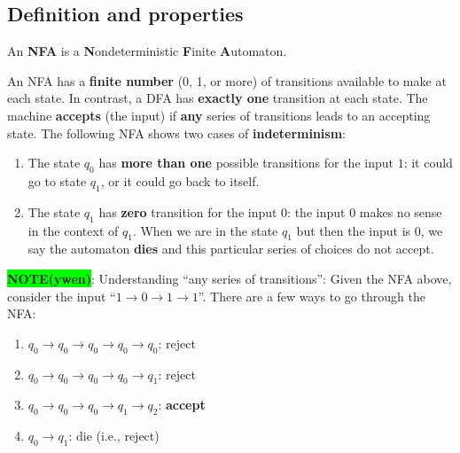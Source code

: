\documentclass[12pt, letterpaper, oneside]{book}
\begin{document}
\subsection{Definition and properties} \label{automata:nfa:definition-and-properties}

An \textbf{NFA} is a \textbf{N}ondeterministic \textbf{F}inite \textbf{A}utomaton.

An NFA has a \textbf{finite number} (0, 1, or more) of transitions available to make at each state. In contrast, a DFA
has \textbf{exactly one} transition at each state. The machine \textbf{accepts} (the input) if \textbf{any} series of
transitions leads to an accepting state. The following NFA shows two cases of \textbf{indeterminism}:


\begin{enumerate}
  \item The state $q_0$ has \textbf{more than one} possible transitions for the input $1$: it could go to state $q_1$,
        or it could go back to itself.
  \item The state $q_1$ has \textbf{zero} transition for the input $0$: the input $0$ makes no sense in the context of
        $q_1$. When we are in the state $q_1$ but then the input is $0$, we say the automaton \textbf{dies} and this
        particular series of choices do not accept.
\end{enumerate}

\colorbox{lime}{\textbf{NOTE(ywen)}}: Understanding ``any series of transitions'': Given the NFA above, consider the
input ``$1 \rightarrow 0 \rightarrow 1 \rightarrow 1$''. There are a few ways to go through the NFA:

\begin{enumerate}
  \item $q_0 \rightarrow q_0 \rightarrow q_0 \rightarrow q_0 \rightarrow q_0$: reject
  \item $q_0 \rightarrow q_0 \rightarrow q_0 \rightarrow q_0 \rightarrow q_1$: reject
  \item $q_0 \rightarrow q_0 \rightarrow q_0 \rightarrow q_1 \rightarrow q_2$: \textbf{accept}
  \item $q_0 \rightarrow q_1 $: die (i.e., reject)
\end{enumerate}
\end{document}
